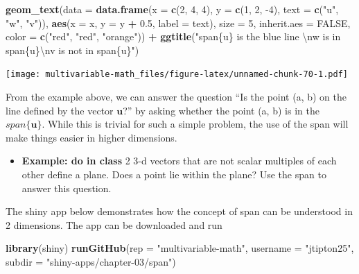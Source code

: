 \documentclass[
]{book}
\newenvironment{Shaded}{\begin{snugshade}}{\end{snugshade}}
\newcommand{\CharTok}[1]{\textcolor[rgb]{0.31,0.60,0.02}{#1}}
\newcommand{\DataTypeTok}[1]{\textcolor[rgb]{0.13,0.29,0.53}{#1}}
\newcommand{\DecValTok}[1]{\textcolor[rgb]{0.00,0.00,0.81}{#1}}
\newcommand{\FloatTok}[1]{\textcolor[rgb]{0.00,0.00,0.81}{#1}}
\newcommand{\KeywordTok}[1]{\textcolor[rgb]{0.13,0.29,0.53}{\textbf{#1}}}
\newcommand{\NormalTok}[1]{#1}
\newcommand{\OperatorTok}[1]{\textcolor[rgb]{0.81,0.36,0.00}{\textbf{#1}}}
\newcommand{\OtherTok}[1]{\textcolor[rgb]{0.56,0.35,0.01}{#1}}
\newcommand{\StringTok}[1]{\textcolor[rgb]{0.31,0.60,0.02}{#1}}
\providecommand{\tightlist}{%
  \setlength{\itemsep}{0pt}\setlength{\parskip}{0pt}}
\theoremstyle{definition}
\theoremstyle{definition}
\theoremstyle{definition}
\theoremstyle{definition}
\theoremstyle{remark}
\begin{document}
\begin{Shaded}
\begin{Highlighting}[]
\StringTok{    }\KeywordTok{geom_text}\NormalTok{(}\DataTypeTok{data =} \KeywordTok{data.frame}\NormalTok{(}\DataTypeTok{x =} \KeywordTok{c}\NormalTok{(}\DecValTok{2}\NormalTok{, }\DecValTok{4}\NormalTok{, }\DecValTok{4}\NormalTok{),  }\DataTypeTok{y =} \KeywordTok{c}\NormalTok{(}\DecValTok{1}\NormalTok{, }\DecValTok{2}\NormalTok{, }\DecValTok{-4}\NormalTok{), }\DataTypeTok{text =} \KeywordTok{c}\NormalTok{(}\StringTok{"u"}\NormalTok{, }\StringTok{"w"}\NormalTok{, }\StringTok{"v"}\NormalTok{)),}
              \KeywordTok{aes}\NormalTok{(}\DataTypeTok{x =}\NormalTok{ x, }\DataTypeTok{y =}\NormalTok{ y }\OperatorTok{+}\StringTok{ }\FloatTok{0.5}\NormalTok{, }\DataTypeTok{label =}\NormalTok{ text), }\DataTypeTok{size =} \DecValTok{5}\NormalTok{, }\DataTypeTok{inherit.aes =} \OtherTok{FALSE}\NormalTok{,}
              \DataTypeTok{color =} \KeywordTok{c}\NormalTok{(}\StringTok{"red"}\NormalTok{, }\StringTok{"red"}\NormalTok{, }\StringTok{"orange"}\NormalTok{)) }\OperatorTok{+}
\StringTok{    }\KeywordTok{ggtitle}\NormalTok{(}\StringTok{"span\{u\} is the blue line }\CharTok{\textbackslash{}n}\StringTok{w is in span\{u\}}\CharTok{\textbackslash{}n}\StringTok{v is not in span\{u\}"}\NormalTok{)}
\end{Highlighting}
\end{Shaded}

\texttt{[image: multivariable-math\_files/figure-latex/unnamed-chunk-70-1.pdf]}

From the example above, we can answer the question ``Is the point (a, b) on the line defined by the vector \(\mathbf{u}\)?'' by asking whether the point (a, b) is in the \(span\{\mathbf{u}\}\). While this is trivial for such a simple problem, the use of the span will make things easier in higher dimensions.

\begin{itemize}
\tightlist
\item
  \textbf{Example: do in class} 2 3-d vectors that are not scalar multiples of each other define a plane. Does a point lie within the plane? Use the span to answer this question.
\end{itemize}

The shiny app below demonstrates how the concept of span can be understood in 2 dimensions. The app can be downloaded and run

\begin{Shaded}
\begin{Highlighting}[]
\KeywordTok{library}\NormalTok{(shiny)}
\KeywordTok{runGitHub}\NormalTok{(}\DataTypeTok{rep =} \StringTok{"multivariable-math"}\NormalTok{,}
          \DataTypeTok{username =} \StringTok{"jtipton25"}\NormalTok{, }
          \DataTypeTok{subdir =} \StringTok{"shiny-apps/chapter-03/span"}\NormalTok{) }
\end{Highlighting}
\end{Shaded}
\end{document}
